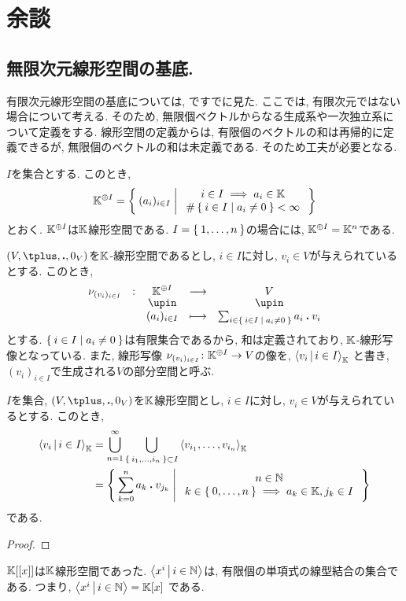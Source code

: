 \begin{quiz}
\end{quiz}






\chapter{余談}
\section{無限次元線形空間の基底.}
有限次元線形空間の基底については,
ですでに見た.
ここでは,
有限次元ではない場合について考える.
そのため,
無限個ベクトルからなる生成系や一次独立系について定義をする.
線形空間の定義からは,
有限個のベクトルの和は再帰的に定義できるが,
無限個のベクトルの和は未定義である.
そのため工夫が必要となる.

$I$を集合とする.
このとき,
\begin{align*}
\mathbb{K}^{\oplus I}=\Set{(a_i)_{i\in I}|
\begin{array}{c}
i\in I\implies a_i\in \mathbb{K}\\
\#\Set{i\in I|a_i\neq 0} <\infty
\end{array}
}
\end{align*}
とおく.
$\mathbb{K}^{\oplus I}$は$\mathbb{K}$線形空間である.
$I=\Set{1,\ldots,n}$の場合には,
$\mathbb{K}^{\oplus I}=\mathbb{K}^n$である.

$(V,\plus,\act,0_V)$を$\mathbb{K}$-線形空間であるとし,
$i\in I$に対し, $v_i \in V$が与えられているとする.
このとき,
\begin{align*}
\shazo{\nu_{(v_i)_{i\in I}}}
{\KK^{\oplus I}}{V}
{(a_i)_{i\in I}}
{\sum_{i\in \Set{i\in I|a_i\neq 0}}a_i\act v_i}
\end{align*}
とする.
$\Set{i\in I|a_i\neq 0}$は有限集合であるから,
和は定義されており,
$\mathbb{K}$-線形写像となっている.
また,
線形写像 $\nu_{(v_i)_{i\in I}}\colon \mathbb{K}^{\oplus I} \to V$の像を,
$\Braket{v_i|i\in I}_{\mathbb{K}}$
と書き,
$(v_i)_{i\in I}$で生成される$V$の部分空間と呼ぶ.

\begin{prop}
  $I$を集合,
  $(V,\plus,\act,0_V)$を$\mathbb{K}$線形空間とし,
  $i\in I$に対し, $v_i\in V$が与えられているとする.
  このとき,
  \begin{align*}
  \Braket{v_i|i\in I}_{\mathbb{K}}
  &=\bigcup_{n=1}^\infty
  \bigcup_{\Set{i_1,\ldots,i_n}\subset I} \Braket{v_{i_1},\ldots,v_{i_n}}_{\mathbb{K}}\\
&=\Set{
  \sum_{k=0}^{n} a_{k}\mathbin{\boldsymbol{.}}v_{j_k}|
  \begin{array}{c}
  n\in \mathbb{N}\\
  k\in\Set{0,\ldots,n}\implies a_k \in \mathbb{K}, j_k\in I
\end{array}}  
  \end{align*}
  である.
\end{prop}
\begin{proof}\end{proof}
\begin{example}
$\mathbb{K}[[x]]$は$\mathbb{K}$線形空間であった.
$\Braket{x^i|i\in \mathbb{N}}$は,
有限個の単項式の線型結合の集合である.
つまり, 
$\Braket{x^i|i\in \mathbb{N}}=\mathbb{K}[x]$
である.
\end{example}




